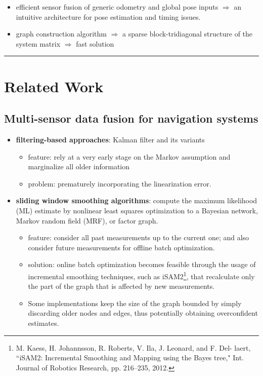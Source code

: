 \documentclass[letterpaper,11pt]{article}
\begin{document}
\begin{itemize}
	\item efficient sensor fusion of generic odometry and global pose inputs $\Rightarrow$ an intuitive architecture for pose estimation and timing issues.
	\item graph construction algorithm $\Rightarrow$ a sparse block-tridiagonal structure of the system matrix $\Rightarrow$ fast solution
\end{itemize}

\begin{center}\rule{\textwidth}{1pt}\end{center}
\section{Related Work}

\subsection{Multi-sensor data fusion for navigation systems}

\begin{itemize}
	\item \textbf{filtering-based approaches}: Kalman filter and its variants
	\begin{itemize}
		\item feature: rely at a very early stage on the Markov assumption and marginalize all older information
		\item problem: prematurely incorporating the linearization error.
	\end{itemize}
	\item \textbf{sliding window smoothing algorithms}: compute the maximum likelihood (ML) estimate by nonlinear least squares optimization to a Bayesian network, Markov random field (MRF), or factor graph.
	\begin{itemize}
		\item feature: consider all past measurements up to the current one; and also consider future measurements for offline batch optimization.
		\item solution: online batch optimization becomes feasible through the usage of incremental smoothing techniques, such as iSAM2\footnote{M. Kaess, H. Johannsson, R. Roberts, V. Ila, J. Leonard, and F. Del- laert, ``iSAM2: Incremental Smoothing and Mapping using the Bayes tree," Int. Journal of Robotics Research, pp. 216–235, 2012.}, that recalculate only the part of the graph that is affected by new measurements.
		\item Some implementations keep the size of the graph bounded by simply discarding older nodes and edges, thus potentially obtaining overconfident estimates.
	\end{itemize}
\end{itemize}
\end{document}
